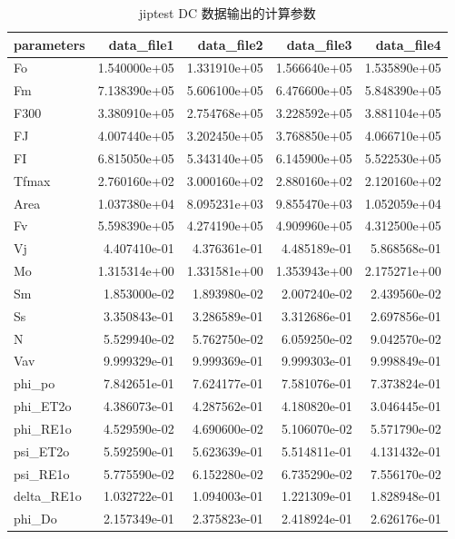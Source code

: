 \documentclass[]{krantz}
\theoremstyle{definition}
\theoremstyle{definition}
\theoremstyle{definition}
\theoremstyle{remark}
\begin{document}
\begin{longtable}{lrrrr}
\caption{\label{tab:dcjipres}jiptest DC 数据输出的计算参数}\\
\toprule
parameters & data\_file1 & data\_file2 & data\_file3 & data\_file4\\
\midrule
Fo & 1.540000e+05 & 1.331910e+05 & 1.566640e+05 & 1.535890e+05\\
Fm & 7.138390e+05 & 5.606100e+05 & 6.476600e+05 & 5.848390e+05\\
F300 & 3.380910e+05 & 2.754768e+05 & 3.228592e+05 & 3.881104e+05\\
FJ & 4.007440e+05 & 3.202450e+05 & 3.768850e+05 & 4.066710e+05\\
FI & 6.815050e+05 & 5.343140e+05 & 6.145900e+05 & 5.522530e+05\\
\addlinespace
Tfmax & 2.760160e+02 & 3.000160e+02 & 2.880160e+02 & 2.120160e+02\\
Area & 1.037380e+04 & 8.095231e+03 & 9.855470e+03 & 1.052059e+04\\
Fv & 5.598390e+05 & 4.274190e+05 & 4.909960e+05 & 4.312500e+05\\
Vj & 4.407410e-01 & 4.376361e-01 & 4.485189e-01 & 5.868568e-01\\
Mo & 1.315314e+00 & 1.331581e+00 & 1.353943e+00 & 2.175271e+00\\
\addlinespace
Sm & 1.853000e-02 & 1.893980e-02 & 2.007240e-02 & 2.439560e-02\\
Ss & 3.350843e-01 & 3.286589e-01 & 3.312686e-01 & 2.697856e-01\\
N & 5.529940e-02 & 5.762750e-02 & 6.059250e-02 & 9.042570e-02\\
Vav & 9.999329e-01 & 9.999369e-01 & 9.999303e-01 & 9.998849e-01\\
phi\_po & 7.842651e-01 & 7.624177e-01 & 7.581076e-01 & 7.373824e-01\\
\addlinespace
phi\_ET2o & 4.386073e-01 & 4.287562e-01 & 4.180820e-01 & 3.046445e-01\\
phi\_RE1o & 4.529590e-02 & 4.690600e-02 & 5.106070e-02 & 5.571790e-02\\
psi\_ET2o & 5.592590e-01 & 5.623639e-01 & 5.514811e-01 & 4.131432e-01\\
psi\_RE1o & 5.775590e-02 & 6.152280e-02 & 6.735290e-02 & 7.556170e-02\\
delta\_RE1o & 1.032722e-01 & 1.094003e-01 & 1.221309e-01 & 1.828948e-01\\
\addlinespace
phi\_Do & 2.157349e-01 & 2.375823e-01 & 2.418924e-01 & 2.626176e-01\\

\end{longtable}
\end{document}
